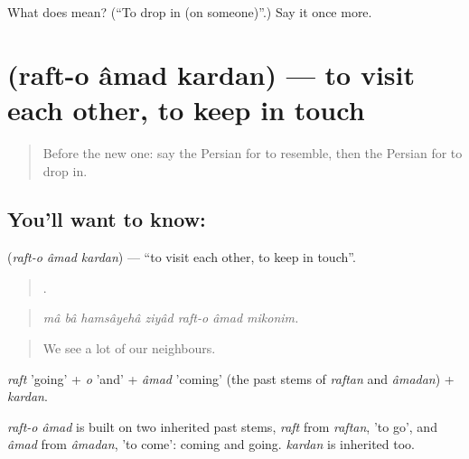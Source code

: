 \begin{tcolorbox}[breakable,colback=teal!4,colframe=teal!35!black,title={Before you move on}]
What does   mean? (\textquotedblleft{}To drop in (on someone)\textquotedblright{}.) Say it once more.
\end{tcolorbox}
\section[\texorpdfstring{\fa{رفت} \fa{و} \fa{آمد} \fa{کردن} (raft-o âmad kardan)}{رفت و آمد کردن (raft-o âmad kardan)}]{    (raft-o âmad kardan) — to visit each other, to keep in touch}

\label{lesson:FA-C506-raft-o-amad-kardan}



\begin{quote}
Before the new one: say the Persian for to resemble, then the Persian for to drop in.
\end{quote}

\subsection*{You'll want to know:    }
\textbf{   } (\emph{raft-o âmad kardan}) — \textquotedblleft{}to visit each other, to keep in touch\textquotedblright{}.

\begin{quote}
        .
\end{quote}

\begin{quote}
\emph{mâ bâ hamsâyehâ ziyâd raft-o âmad mikonim.}
\end{quote}

\begin{quote}
We see a lot of our neighbours.
\end{quote}

\emph{raft} 'going' + \emph{o} 'and' + \emph{âmad} 'coming' (the past stems of \emph{raftan} and \emph{âmadan}) + \emph{kardan}.

\begin{cousinweb}
\emph{raft-o âmad} is built on two inherited past stems, \emph{raft} from \emph{raftan}, 'to go', and \emph{âmad} from \emph{âmadan}, 'to come': coming and going. \emph{kardan} is inherited too.
\end{cousinweb}

